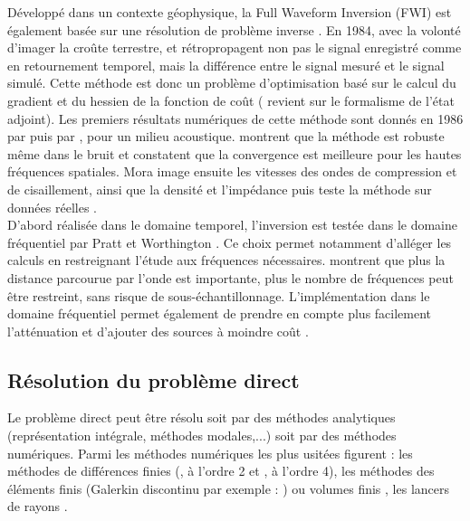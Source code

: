 \documentclass[]{article}
\begin{document}
Développé dans un contexte géophysique, la Full Waveform Inversion (FWI) est également basée sur une résolution de problème inverse \citep{virieux_review}. En 1984, avec la volonté d'imager la croûte terrestre, \cite{lailly} et \cite{tarantola_84} rétropropagent non pas le signal enregistré comme en retournement temporel, mais la différence entre le signal mesuré et le signal simulé. Cette méthode est donc un problème d'optimisation basé sur le calcul du gradient et du hessien de la fonction de coût (\cite{plessix} revient sur le formalisme de l'état adjoint). Les premiers résultats numériques de cette méthode sont donnés en 1986 par \cite{kolb} puis par \cite{gauthier_86}, pour un milieu acoustique. \cite{kolb} montrent que la méthode est robuste même dans le bruit et \cite{gauthier_86} constatent que la convergence est meilleure pour les hautes fréquences spatiales. Mora image ensuite les vitesses des ondes de compression et de cisaillement, ainsi que la densité et l'impédance \citep{mora_87a} puis teste la méthode sur données réelles \citep{mora_87b}. \\

D'abord réalisée dans le domaine temporel, l'inversion est testée dans le domaine fréquentiel par Pratt et Worthington \citep{pratt_90a, pratt_90b}. Ce choix permet notamment d'alléger les calculs en restreignant l'étude aux fréquences nécessaires. \cite{sirgue} montrent que plus la distance parcourue par l'onde est importante, plus le nombre de fréquences peut être restreint, sans risque de sous-échantillonnage. L'implémentation dans le domaine fréquentiel permet également de prendre en compte plus facilement l'atténuation et d'ajouter des sources à moindre coût \citep{pratt_90a,pratt_90b}.





\subsection*{Résolution du problème direct}
Le problème direct peut être résolu soit par des méthodes analytiques (représentation intégrale, méthodes modales,...) soit par des méthodes numériques. Parmi les méthodes numériques les plus usitées figurent : les méthodes de différences finies (\citealp{virieux_86}, à l'ordre 2 et \citealp{levander}, à l'ordre 4), les méthodes des éléments finis (Galerkin discontinu par exemple : \citealp{brossier_these}) ou volumes finis \citep{brossier_2008}, les lancers de rayons \citep{virieux_ray}. 
\end{document}
